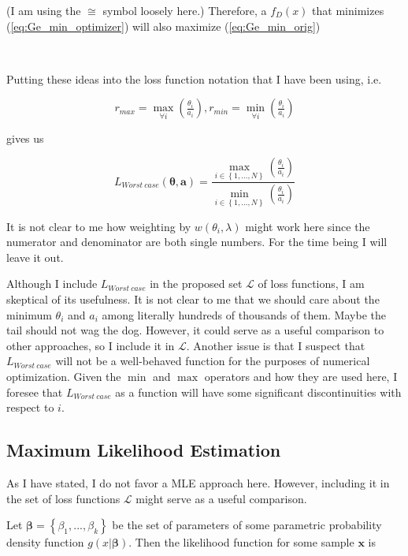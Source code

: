 \documentclass[english]{article}
\begin{document}
(I am using the $\cong$ symbol loosely here.) Therefore, a $f_{D}(x)$
that minimizes (\ref{eq:Ge_min_optimizer}) will also maximize (\ref{eq:Ge_min_orig})

$ $

Putting these ideas into the loss function notation that I have been
using, i.e.

\[
r_{max}=\underset{\forall i}{\max}\left(\tfrac{\theta_{i}}{a_{i}}\right),r_{min}=\underset{\forall i}{\min}\left(\tfrac{\theta_{i}}{a_{i}}\right)
\]

gives us

\begin{equation}
L_{Worst\:case}(\boldsymbol{\theta},\boldsymbol{a})=\dfrac{\underset{i\in\left\{ 1,...,N\right\} }{\max}\left(\tfrac{\theta_{i}}{a_{i}}\right)}{\underset{i\in\left\{ 1,...,N\right\} }{\min}\left(\tfrac{\theta_{i}}{a_{i}}\right)}\label{eq:L-Worst-case}
\end{equation}

It is not clear to me how weighting by $w(\theta_{i},\lambda)$ might
work here since the numerator and denominator are both single numbers.
For the time being I will leave it out.

Although I include $L_{Worst\:case}$ in the proposed set $\mathcal{L}$
of loss functions, I am skeptical of its usefulness. It is not clear
to me that we should care about the minimum $\theta_{i}$ and $a_{i}$
among literally hundreds of thousands of them. Maybe the tail should
not wag the dog. However, it could serve as a useful comparison to
other approaches, so I include it in $\mathcal{L}$. Another issue
is that I suspect that $L_{Worst\:case}$ will not be a well-behaved
function for the purposes of numerical optimization. Given the $\min$
and $\max$ operators and how they are used here, I foresee that $L_{Worst\:case}$
as a function will have some significant discontinuities with respect
to $i$. 

\subsection{Maximum Likelihood Estimation}

As I have stated, I do not favor a MLE approach here. However, including
it in the set of loss functions $\mathcal{L}$ might serve as a useful
comparison.

Let $\boldsymbol{\beta}=\left\{ \beta_{1},...,\beta_{k}\right\} $
be the set of parameters of some parametric probability density function
$g(x|\boldsymbol{\beta})$. Then the likelihood function for some
sample $\mathbf{x}$ is
\end{document}
